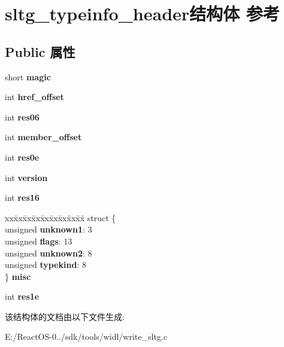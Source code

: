 \hypertarget{structsltg__typeinfo__header}{}\section{sltg\+\_\+typeinfo\+\_\+header结构体 参考}
\label{structsltg__typeinfo__header}
\subsection*{Public 属性}
\begin{DoxyCompactItemize}
\item 
\mbox{\label{structsltg__typeinfo__header_a926e5e518aa9a104f09c8becdac4083f}} 
short {\bfseries magic}
\item 
\mbox{\label{structsltg__typeinfo__header_abfebe7e6f7ee13b6bf89f2e4c1ce5f40}} 
int {\bfseries href\+\_\+offset}
\item 
\mbox{\label{structsltg__typeinfo__header_a0b759e0d1fa02fb5d9ca213fcd44a15e}} 
int {\bfseries res06}
\item 
\mbox{\label{structsltg__typeinfo__header_a2631e903238d1f43737e95dd881208b7}} 
int {\bfseries member\+\_\+offset}
\item 
\mbox{\label{structsltg__typeinfo__header_ae52dac5286c3956db049db464ff86bde}} 
int {\bfseries res0e}
\item 
\mbox{\label{structsltg__typeinfo__header_a5af5fbc3db4a10b43a306513ab933782}} 
int {\bfseries version}
\item 
\mbox{\label{structsltg__typeinfo__header_a1787c4d115f555e36be047db177d0552}} 
int {\bfseries res16}
\item 
\mbox{\label{structsltg__typeinfo__header_a109e323ec27e342d8bad9338c4668f6d}} 
\begin{tabbing}
xx\=xx\=xx\=xx\=xx\=xx\=xx\=xx\=xx\=\kill
struct \{\\
\>unsigned {\bfseries unknown1}: 3\\
\>unsigned {\bfseries flags}: 13\\
\>unsigned {\bfseries unknown2}: 8\\
\>unsigned {\bfseries typekind}: 8\\
\} {\bfseries misc}\\

\end{tabbing}\item 
\mbox{\label{structsltg__typeinfo__header_a1a08c4b7234767feb10fadf43f73f924}} 
int {\bfseries res1e}
\end{DoxyCompactItemize}


该结构体的文档由以下文件生成\+:\begin{DoxyCompactItemize}
\item 
E\+:/\+React\+O\+S-\/0../sdk/tools/widl/write\+\_\+sltg.\+c\end{DoxyCompactItemize}
